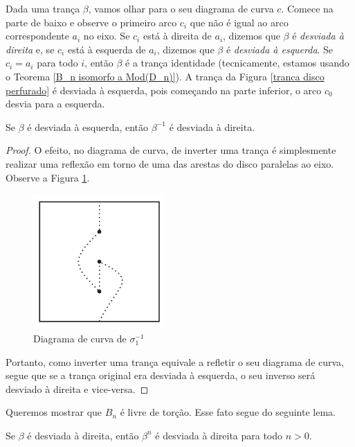 	\par\vspace{0.3cm} Dada uma trança $\beta$, vamos olhar para o seu diagrama de curva $c$. 
	Comece na parte de baixo e observe o primeiro arco $c_i$ que não é igual ao arco correspondente $a_i$ 
	no eixo. Se $c_i$ está à direita de $a_i$, dizemos que $\beta$ é \textit{desviada à direita} e, 
	se $c_i$ está à esquerda de $a_i$, dizemos que $\beta$ é \textit{desviada à esquerda}. 
	Se $c_i = a_i$ para todo $i$, então $\beta$ é a trança identidade (tecnicamente, estamos usando o 
	Teorema \ref{B_n isomorfo a Mod(D_n)}). A trança da Figura \ref{tranca disco perfurado} é 
	desviada à esquerda, pois começando na parte inferior, o arco $c_0$ desvia para a esquerda.
	\begin{prop}
	\label{desvio a direita desvio a esquerda}
		Se $\beta$ é desviada à esquerda, então $\beta^{-1}$ é desviada à direita.
	\end{prop}
	\begin{proof}
		O efeito, no diagrama de curva, de inverter uma trança é simplesmente realizar uma 
		reflexão em torno de uma das arestas do disco paralelas ao eixo. Observe a 
		Figura \ref{diagrama inverso de sigma1}.
		\begin{figure}[H]
		\begin{center}
			\includegraphics[width=5cm]{Images/inverso.png}
		\end{center}\caption{Diagrama de curva de $\sigma_1^{-1}$}\label{diagrama inverso de sigma1}
		\end{figure}
		Portanto, como inverter uma trança equivale a refletir o seu diagrama de curva, segue que 
		se a trança original era desviada à esquerda, o seu inverso será desviado à direita e vice-versa.
	\end{proof}
	Queremos mostrar que $B_n$ é livre de torção. Esse fato segue do seguinte lema.
	\begin{lemma}
	\label{desviada a direita, sempre a direita}
		Se $\beta$ é desviada à direita, então $\beta^n$ é desviada à direita para todo $n>0$.
	\end{lemma}
